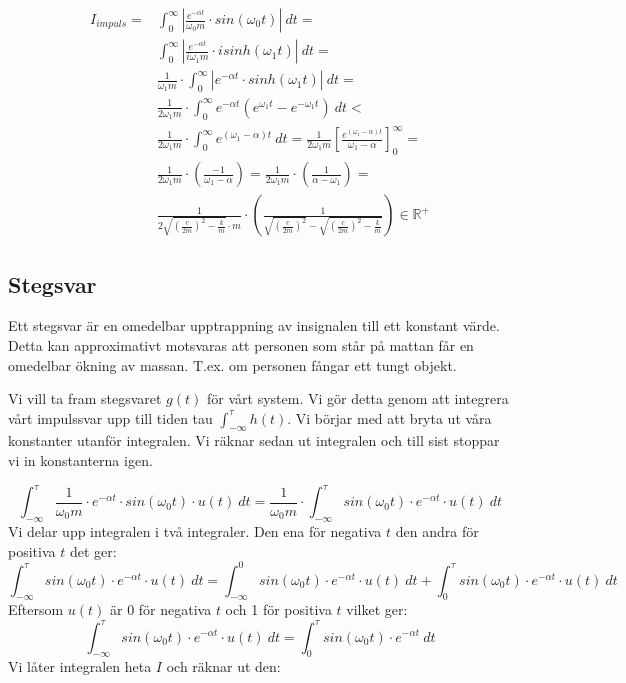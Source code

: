 \documentclass[10pt,a4paper]{article}
\begin{document}
\begin{itemize}
\begin{equation}
\begin{split}
I_{impuls}= & \int_{0}^{\infty}\left|\frac{e^{-\alpha t}}{\omega_0  m}\cdot sin(\omega_0 t)\right| \ dt=\\ & \int_{0}^{\infty}\left|\frac{e^{-\alpha t}}{i\omega_1 m}\cdot i sinh(\omega_1 t)\right| \ dt=\\ & \frac{1}{\omega_1  m} \cdot \int_{0}^{\infty}\left|e^{-\alpha t}\cdot sinh(\omega_1 t)\right| \ dt=\\ & \frac{1}{2 \omega_1  m} \cdot \int_{0}^{\infty}e^{-\alpha t} \left( e^{\omega_1 t}-e^{-\omega_1 t} \right) \ dt< \\ & \frac{1}{2\omega_1  m} \cdot \int_{0}^{\infty}e^{(\omega_1-\alpha) t} \  dt=\frac{1}{2\omega_1  m}\left[\frac{e^{(\omega_1-\alpha) t}}{\omega_1-\alpha} \right]_{0}^{\infty}=\\ & \frac{1}{2\omega_1  m}\cdot\left(\frac{-1}{\omega_1-\alpha} \right)=\frac{1}{2\omega_1  m} \cdot \left(\frac{1}{\alpha-\omega_1} \right)=\\ & \frac{1}{2 \sqrt{\left(\frac{c}{2 m}\right)^2-\frac{k}{m}}   \cdot m} \cdot \left(\frac{1}{\sqrt{\left(\frac{c}{2 m}\right)^2}-\sqrt{\left(\frac{c}{2 m}\right)^2-\frac{k}{m}}} \right)\in \mathbb{R}^+
\end{split}
\end{equation}
\end{itemize}

\newpage

\subsection{Stegsvar}
Ett stegsvar är en omedelbar upptrappning av insignalen till ett konstant värde. Detta kan approximativt motsvaras att personen som står på mattan får en omedelbar ökning av massan. T.ex. om personen fångar ett tungt objekt.

Vi vill ta fram stegsvaret $g(t)$ för vårt system. Vi gör detta genom att integrera vårt impulssvar upp till tiden tau $\int_{-\infty}^\tau h(t)$. Vi börjar med att bryta ut våra konstanter utanför integralen. Vi räknar sedan ut integralen och till sist stoppar vi in konstanterna igen.

\begin{equation}
\int_{-\infty}^\tau \frac{1} {\omega_0 m} \cdot e^{-\alpha  t} \cdot sin(\omega_0  t) \cdot u(t) \  dt = \frac{1}{\omega_0  m} \cdot \int_{-\infty}^\tau sin(\omega_0 t)\cdot e^{-\alpha  t} \cdot u(t) \  dt
\end{equation}
Vi delar upp integralen i två integraler. Den ena för negativa $t$ den andra för positiva $t$ det ger:
$$ \int_{-\infty}^\tau sin(\omega_0  t)\cdot e^{-\alpha t} \cdot u(t)  \ dt
= \int_{-\infty}^0 sin(\omega_0  t)\cdot e^{-\alpha  t} \cdot u(t) \  dt + \int_0^\tau sin(\omega_0  t)\cdot e^{-\alpha  t} \cdot u(t) \  dt $$
Eftersom $u(t)$ är 0 för negativa $t$ och 1 för positiva $t$ vilket ger:
\begin{equation}
\int_{-\infty}^\tau sin(\omega_0  t)\cdot e^{-\alpha  t} \cdot u(t) \  dt
= \int_0^\tau sin(\omega_0  t)\cdot e^{-\alpha t} \  dt
\end{equation}
Vi låter integralen heta $I$ och räknar ut den:
\end{document}
